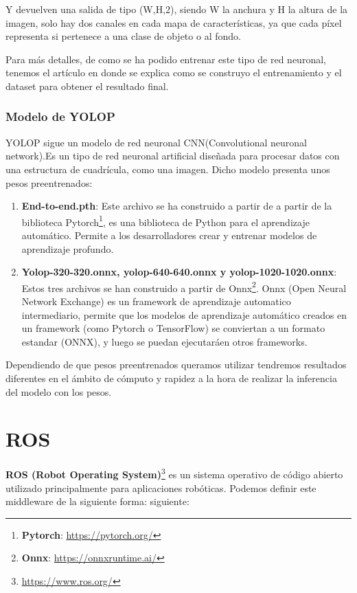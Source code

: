 Y devuelven una salida de tipo (W,H,2), siendo W la anchura y H la altura de la imagen, solo hay dos canales en cada mapa de características, ya que cada píxel 
representa si pertenece a una clase de objeto o al fondo. 

Para más detalles, de como se ha podido entrenar este tipo de red neuronal, tenemos el artículo \cite{YOLOP} en donde se explica
como se construyo el entrenamiento y el dataset para obtener el resultado final. 
\subsubsection{Modelo de YOLOP}
\label{sec:Modelo_YOLOP}

YOLOP sigue un modelo de red neuronal CNN(Convolutional neuronal network).Es un tipo de red neuronal artificial diseñada para procesar datos con una
estructura de cuadrícula, como una imagen. Dicho modelo presenta unos pesos preentrenados: 

\begin{enumerate}
  \item \textbf{End-to-end.pth}: Este archivo se ha construido a partir de a partir de la biblioteca Pytorch\footnote{\textbf{Pytorch}: \url{https://pytorch.org/}}, es una biblioteca de Python para el aprendizaje
  automático. Permite a los desarrolladores crear y entrenar modelos de aprendizaje profundo. 
  \item \textbf{Yolop-320-320.onnx, yolop-640-640.onnx y yolop-1020-1020.onnx}: Estos tres archivos se han construido a partir de Onnx\footnote{\textbf{Onnx}: \url{https://onnxruntime.ai/}}. 
  Onnx (Open Neural Network Exchange) es un framework de aprendizaje automatico intermediario, permite que los modelos de aprendizaje
  automático creados en un framework (como Pytorch o TensorFlow) se conviertan a un formato estandar (ONNX), y luego se puedan ejecutaráen otros frameworks. 
\end{enumerate}

Dependiendo de que pesos preentrenados queramos utilizar tendremos resultados diferentes en el ámbito de cómputo y rapidez a la hora de 
realizar la inferencia del modelo con los pesos. 
\section{ROS}
\label{sec:ros}
\textbf{ROS (Robot Operating System)}\footnote{\url{https://www.ros.org/}} es un sistema operativo de código abierto utilizado principalmente para aplicaciones robóticas. 
Podemos definir este middleware de la siguiente forma:
siguiente:

